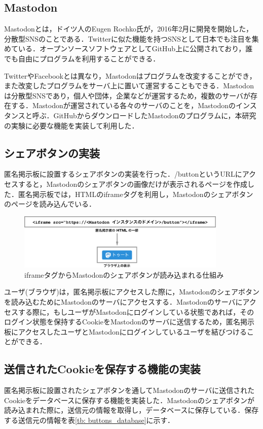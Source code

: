 \documentclass[10pt, a4paper]{jreport}
\begin{document}
\subsection*{Mastodon}
Mastodonとは，ドイツ人のEugen Rochko氏が，2016年2月に開発を開始した，分散型SNSのことである\cite{what_is_mastodon}．Twitterに似た機能を持つSNSとして日本でも注目を集めている．オープンソースソフトウェアとしてGitHub上に公開されており，誰でも自由にプログラムを利用することができる．

TwitterやFacebookとは異なり，Mastodonはプログラムを改変することができ，また改変したプログラムをサーバ上に置いて運営することもできる．Mastodonは分散型SNSであり，個人や団体，企業などが運営するため，複数のサーバが存在する．Mastodonが運営されている各々のサーバのことを，Mastodonのインスタンスと呼ぶ．GitHubからダウンロードしたMastodonのプログラムに，本研究の実験に必要な機能を実装して利用した．

\subsection{シェアボタンの実装}
匿名掲示板に設置するシェアボタンの実装を行った．/buttonというURLにアクセスすると，Mastodonのシェアボタンの画像だけが表示されるページを作成した．匿名掲示板では，HTMLのiframeタグを利用し，Mastodonのシェアボタンのページを読み込んでいる．

\begin{figure}[H]
	\begin{center}
		\includegraphics[width=100mm]{figures/iframe_src.pdf}
	\end{center}
	\caption{iframeタグからMastodonのシェアボタンが読み込まれる仕組み}
	\label{fig: iframe_src}
\end{figure}

ユーザ(ブラウザ)は，匿名掲示板にアクセスした際に，Mastodonのシェアボタンを読み込むためにMastodonのサーバにアクセスする．Mastodonのサーバにアクセスする際に，もしユーザがMastodonにログインしている状態であれば，そのログイン状態を保持するCookieをMastodonのサーバに送信するため，匿名掲示板にアクセスしたユーザとMastodonにログインしているユーザを結びつけることができる．

\subsection{送信されたCookieを保存する機能の実装}\label{sec: save_cookie}
匿名掲示板に設置されたシェアボタンを通してMastodonのサーバに送信されたCookieをデータベースに保存する機能を実装した．Mastodonのシェアボタンが読み込まれた際に，送信元の情報を取得し，データベースに保存している．保存する送信元の情報を表\ref{tb: buttons_database}に示す．
\end{document}
